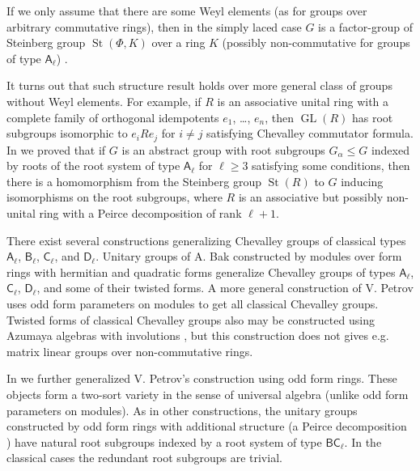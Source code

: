 \documentclass{article}
\theoremstyle{definition}
\DeclareMathOperator\glin{GL}
\DeclareMathOperator\stlin{St}
\begin{document}
If we only assume that there are some Weyl elements (as for groups over arbitrary commutative rings), then in the simply laced case \(G\) is a factor-group of Steinberg group \(\stlin(\Phi, K)\) over a ring \(K\) (possibly non-commutative for groups of type \(\mathsf A_\ell\)) \cite{graded-groups}.

It turns out that such structure result holds over more general class of groups without Weyl elements. For example, if \(R\) is an associative unital ring with a complete family of orthogonal idempotents \(e_1\), \ldots, \(e_n\), then \(\glin(R)\) has root subgroups isomorphic to \(e_i R e_j\) for \(i \neq j\) satisfying Chevalley commutator formula. In \cite{a-com-rel} we proved that if \(G\) is an abstract group with root subgroups \(G_\alpha \leq G\) indexed by roots of the root system of type \(\mathsf A_\ell\) for \(\ell \geq 3\) satisfying some conditions, then there is a homomorphism from the Steinberg group \(\stlin(R)\) to \(G\) inducing isomorphisms on the root subgroups, where \(R\) is an associative but possibly non-unital ring with a Peirce decomposition of rank \(\ell + 1\).

There exist several constructions \cite{bak, calmes-fasel, knus, inv-book, odd-def-petrov, def-tits, def-weil} generalizing Chevalley groups of classical types \(\mathsf A_\ell\), \(\mathsf B_\ell\), \(\mathsf C_\ell\), and \(\mathsf D_\ell\). Unitary groups of A. Bak \cite{bak} constructed by modules over form rings with hermitian and quadratic forms generalize Chevalley groups of types \(\mathsf A_\ell\), \(\mathsf C_\ell\), \(\mathsf D_\ell\), and some of their twisted forms. A more general construction of V. Petrov \cite{odd-def-petrov} uses odd form parameters on modules to get all classical Chevalley groups. Twisted forms of classical Chevalley groups also may be constructed using Azumaya algebras with involutions \cite{inv-book}, but this construction does not gives e.g. matrix linear groups over non-commutative rings.

In \cite{thesis, classic-ofa} we further generalized V. Petrov's construction using odd form rings. These objects form a two-sort variety in the sense of universal algebra (unlike odd form parameters on modules). As in other constructions, the unitary groups constructed by odd form rings with additional structure (a Peirce decomposition \cite{thesis}) have natural root subgroups indexed by a root system of type \(\mathsf{BC}_\ell\). In the classical cases the redundant root subgroups are trivial.
\end{document}
